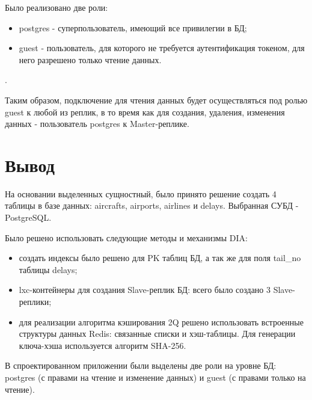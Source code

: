 Было реализовано две роли:
\begin{itemize}
	\item postgres - суперпользователь, имеющий все привилегии в БД;
	\item guest - пользователь, для которого не требуется аутентификация токеном, для него разрешено только чтение данных.
\end{itemize}.

Таким образом, подключение для чтения данных будет осуществляться под ролью guest к любой из реплик, в то время как для создания, удаления, изменения данных - пользователь postgres к Master-реплике. 


\section*{Вывод}

На основании выделенных сущностный, было принято решение создать 4 таблицы в базе данных: aircrafts, airports, airlines и delays. Выбранная СУБД - PostgreSQL.

Было решено использовать следующие методы и механизмы DIA:
\begin{itemize}
	\item создать индексы было решено для PK таблиц БД, а так же для поля tail\_no таблицы delays;
	\item lxc-контейнеры для создания Slave-реплик БД: всего было создано 3 Slave-реплики;
	\item для реализации алгоритма кэширования 2Q решено использовать встроенные структуры данных Redis: связанные списки и хэш-таблицы. Для генерации ключа-хэша используется алгоритм SHA-256.
\end{itemize}

В спроектированном приложении были выделены две роли на уровне БД: postgres (с правами на чтение и изменение данных) и guest (с правами только на чтение).